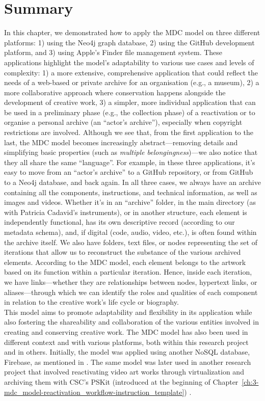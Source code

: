 \section{Summary}
In this chapter, we demonstrated how to apply the MDC model on three different platforms: 1) using the Neo4j graph database, 2) using the GitHub development platform, and 3) using Apple’s Finder file management system. These applications highlight the model’s adaptability to various use cases and levels of complexity: 1) a more extensive, comprehensive application that could reflect the needs of a web-based or private archive for an organisation (e.g., a museum), 2) a more collaborative approach where conservation happens alongside the development of creative work, 3) a simpler, more individual application that can be used in a preliminary phase (e.g., the collection phase) of a reactivation or to organise a personal archive (an “actor’s archive”), especially when copyright restrictions are involved. Although we see that, from the first application to the last, the MDC model becomes increasingly abstract—removing details and simplifying basic properties (such as \textit{multiple belongingness})—we also notice that they all share the same ``language''. For example, in these three applications, it’s easy to move from an ``actor’s archive'' to a GitHub repository, or from GitHub to a Neo4j database, and back again. In all three cases, we always have an archive containing all the components, instructions, and technical information, as well as images and videos. Whether it’s in an ``archive'' folder, in the main directory (as with Patricia Cadavid’s instruments), or in another structure, each element is independently functional, has its own descriptive record (according to our metadata schema), and, if digital (code, audio, video, etc.), is often found within the archive itself. We also have folders, text files, or nodes representing the set of iterations that allow us to reconstruct the substance of the various archived elements. According to the MDC model, each element belongs to the artwork based on its function within a particular iteration. Hence, inside each iteration, we have links—whether they are relationships between nodes, hypertext links, or aliases—through which we can identify the roles and qualities of each component in relation to the creative work’s life cycle or biography.\\
This model aims to promote adaptability and flexibility in its application while also fostering the shareability and collaboration of the various entities involved in creating and conserving creative work. The MDC model has also been used in different context and with various platforms, both within this research project and in others. Initially, the model was applied using another NoSQL database, Firebase, as mentioned in \cite{fiordelmondo2023multilevel}. The same model was later used in another research project that involved reactivating video art works through virtualization and archiving them with CSC’s PSKit (introduced at the beginning of Chapter~\ref{ch:3-mdc_model-reactivation_workflow-instruction_template}) \cite{russo2024revitalizing, russo2024use, russo2024virtual}.\\
